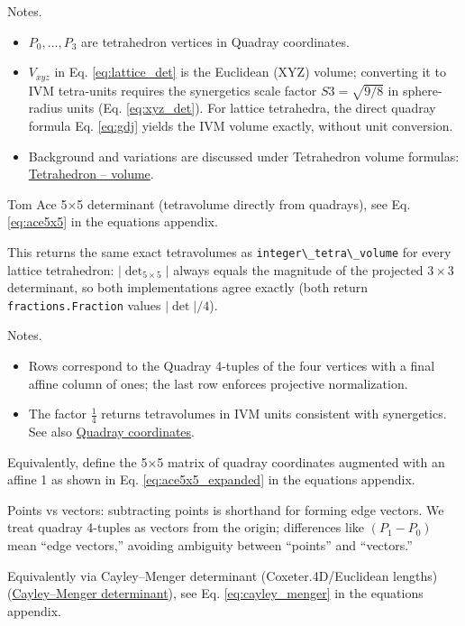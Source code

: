 \documentclass[
  10pt,
]{article}
\newcommand{\passthrough}[1]{#1}
\providecommand{\tightlist}{%
  \setlength{\itemsep}{0pt}\setlength{\parskip}{0pt}}
\begin{document}
Notes.

\begin{itemize}
\tightlist
\item
  \(P_0,\ldots,P_3\) are tetrahedron vertices in Quadray coordinates.
\item
  \(V_{xyz}\) in Eq. \eqref{eq:lattice_det} is the Euclidean (XYZ)
  volume; converting it to IVM tetra-units requires the synergetics
  scale factor \(S3=\sqrt{9/8}\) in sphere-radius units (Eq.
  \eqref{eq:xyz_det}). For lattice tetrahedra, the direct quadray
  formula Eq. \eqref{eq:gdj} yields the IVM volume exactly, without unit
  conversion.
\item
  Background and variations are discussed under Tetrahedron volume
  formulas:
  \href{https://en.wikipedia.org/wiki/Tetrahedron\#Volume}{Tetrahedron
  -- volume}.
\end{itemize}

Tom Ace 5×5 determinant (tetravolume directly from quadrays), see Eq.
\eqref{eq:ace5x5} in the equations appendix.

This returns the same exact tetravolumes as
\passthrough{\lstinline!integer\_tetra\_volume!} for every lattice
tetrahedron: \(|\det_{5\times5}|\) always equals the magnitude of the
projected \(3\times3\) determinant, so both implementations agree
exactly (both return \passthrough{\lstinline!fractions.Fraction!} values
\(|\det|/4\)).

Notes.

\begin{itemize}
\tightlist
\item
  Rows correspond to the Quadray 4-tuples of the four vertices with a
  final affine column of ones; the last row enforces projective
  normalization.
\item
  The factor \(\tfrac{1}{4}\) returns tetravolumes in IVM units
  consistent with synergetics. See also
  \href{https://en.wikipedia.org/wiki/Quadray_coordinates}{Quadray
  coordinates}.
\end{itemize}

Equivalently, define the 5×5 matrix of quadray coordinates augmented
with an affine 1 as shown in Eq. \eqref{eq:ace5x5_expanded} in the
equations appendix.

Points vs vectors: subtracting points is shorthand for forming edge
vectors. We treat quadray 4-tuples as vectors from the origin;
differences like \((P_1-P_0)\) mean ``edge vectors,'' avoiding ambiguity
between ``points'' and ``vectors.''

Equivalently via Cayley--Menger determinant (Coxeter.4D/Euclidean
lengths)
(\href{https://en.wikipedia.org/wiki/Cayley\%E2\%80\%93Menger_determinant}{Cayley--Menger
determinant}), see Eq. \eqref{eq:cayley_menger} in the equations
appendix.
\end{document}
